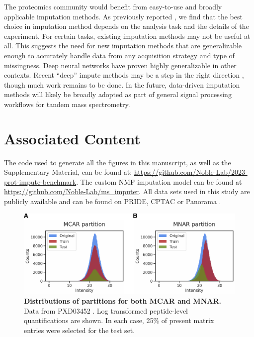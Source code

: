 \documentclass{article}
\begin{document}
The proteomics community would benefit from easy-to-use and broadly applicable imputation methods. As previously reported \cite{Bramer:review, Webb-Robertson:review, DIMA, lazar}, we find that the best choice in imputation method depends on the analysis task and the details of the experiment. For certain tasks, existing imputation methods may not be useful at all. This suggests the need for new imputation methods that are generalizable enough to accurately handle data from any acquisition strategy and type of missingness. Deep neural networks have proven highly generalizable in other contexts. Recent ``deep'' impute methods may be a step in the right direction \cite{deep-impute}, though much work remains to be done. In the future, data-driven imputation methods will likely be broadly adopted as part of general signal processing workflows for tandem mass spectrometry.

\section*{Associated Content}

The code used to generate all the figures in this manuscript, as well as the Supplementary Material, can be found at: \url{https://github.com/Noble-Lab/2023-prot-impute-benchmark}. The custom NMF imputation model can be found at \url{https://github.com/Noble-Lab/ms_imputer}. All data sets used in this study are publicly available and can be found on PRIDE, CPTAC or Panorama \cite{PRIDE, CPTAC, panorama-public}. 


 

\clearpage
\appendix
\renewcommand{\figurename}{Supplementary Figure}
\renewcommand{\theequation}{S\arabic{equation}}
\renewcommand{\thefigure}{S\arabic{figure}}
\renewcommand{\thesection}{S\arabic{section}}
\renewcommand{\thetable}{S\arabic{table}}
\setcounter{table}{0}
\setcounter{figure}{0}

\begin{figure}
  \centering
  \includegraphics[width=1.0\textwidth]{figures/partition-distributions-figure-v1.pdf}
  \caption{{\bf Distributions of partitions for both MCAR and MNAR.} Data from PXD03452 \cite{smtg-maccoss}. Log transformed peptide-level quantifications are shown. In each case, 25\% of present matrix entries were selected for the test set.}
  \label{fig:partitions}
\end{figure} 
\end{document}

